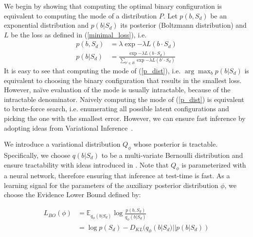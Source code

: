 We begin by showing that computing the optimal binary configuration is equivalent to computing the mode of a distribution $P$. Let $p(b,S_d)$ be an exponential distribution and $p(b|S_d)$ its posterior (Boltzmann distribution) and $L$ be the loss as defined in (\ref{minimal_loss}), i.e. 
\begin{align}
p(b, S_d) &= \lambda \exp{- \lambda L(b\cdot S_d)}\\
p(b|S_d) &= \frac {\exp{- \lambda L(b\cdot S_d)}}{\sum _{b' \in B}{\exp{- \lambda L(b'\cdot S_d)}}} \label{p_dist}
\end{align}
It is easy to see that computing the mode of (\ref{p_dist}), i.e. $\arg\max_b p(b|S_d)$ is equivalent to choosing the binary configuration that results in the smallest loss. However, na\"ive evaluation of the mode is usually intractable, because of the intractable denominator. Naively computing the mode of (\ref{p_dist}) is equivalent to brute-force search, i.e. enumerating all possible latent configurations and picking the one with the smallest error. However, we can ensure fast inference by adopting ideas from Variational Inference~\cite{wainwright2008graphical}.

We introduce a variational distribution $Q_\phi$ whose posterior is tractable. Specifically, we choose $q(b|S_d)$ to be a multi-variate Bernoulli distribution and ensure tractability with ideas introduced in \cite{lange2018factornet}. Note that $Q_\phi$ is parameterized with a neural network, therefore ensuring that inference at test-time is fast. As a learning signal for the parameters of the auxiliary posterior distribution $\phi$, we choose the Evidence Lower Bound defined by:

\begin{align}
L_{BO}(\phi) &= \mathbb{E}_{q_\phi(b|S_d)} \log \frac{p(b,S_d)}{q_\phi(b|S_d)} \label{elbo}\\
&= \log p(S_d) - D_{KL}(q_\phi(b|S_d) || p(b|S_d))
\end{align}

